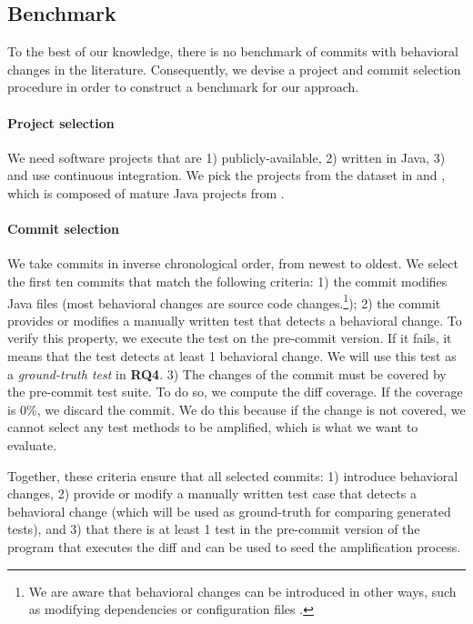 \subsection{Benchmark}
\label{sec:benchmark}
To the best of our knowledge, there is no benchmark of commits  with behavioral changes in the literature. Consequently, we devise a project and commit selection procedure in order to construct a benchmark for our approach.

\paragraph{Project selection}
We need software projects that are
1) publicly-available,
2) written in Java,
3) and use continuous integration.
%
We pick the projects from the dataset in \cite{descartes} and \cite{dspot-emse}, which is composed of mature Java projects from \gh.

\rev{}

\paragraph{Commit selection}
We take commits in inverse chronological order, from newest to oldest.
We select the first ten commits that match the following criteria:
1) the commit modifies Java files (most behavioral changes are source code changes.\footnote{We are aware that behavioral changes can be introduced in other ways, such as modifying dependencies or configuration files \cite{Test:Coverage:Evolution}.});
2) the commit provides or modifies a manually written test that detects a behavioral change. 
To verify this property, we execute the test on the pre-commit version. 
If it fails, it means that the test detects at least 1 behavioral change.
We will use this test as a \textit{ground-truth test} in \textbf{RQ4}.
3) The changes of the commit must be covered by the pre-commit test suite.
To do so, we compute the diff coverage. 
If the coverage is 0\%, we discard the commit. 
We do this because if the change is not covered, we cannot select any test methods to be amplified, which is what we want to evaluate.

Together, these criteria ensure that all selected commits:
1) introduce behavioral changes,
2) provide or modify a manually written test case that detects a behavioral change (which will be used as ground-truth for comparing generated tests), and
3) that there is at least 1 test in the pre-commit version of the program that executes the diff and can be used to seed the amplification process.

